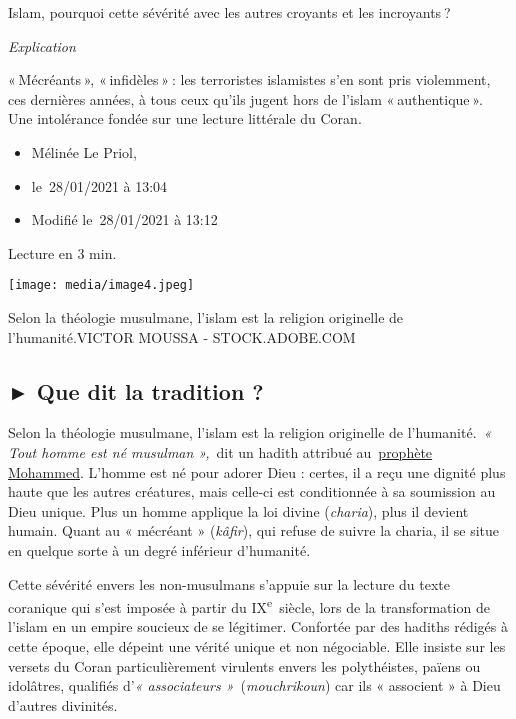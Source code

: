 Islam, pourquoi cette sévérité avec les autres croyants et les
incroyants ?

\emph{Explication~}

« Mécréants », « infidèles » : les terroristes islamistes s'en sont pris
violemment, ces dernières années, à tous ceux qu'ils jugent hors de
l'islam « authentique ». Une intolérance fondée sur une lecture
littérale du Coran. 

\begin{itemize}
\item
  Mélinée Le Priol,~
\item
  le~28/01/2021 à 13:04~
\item
  Modifié le~28/01/2021 à 13:12
\end{itemize}

Lecture en 3 min.

\texttt{[image: media/image4.jpeg]}

Selon la théologie musulmane, l'islam est la religion originelle de
l'humanité.VICTOR MOUSSA - STOCK.ADOBE.COM

\subsection{► Que dit la tradition ?}

Selon la théologie musulmane, l'islam est la religion originelle de
l'humanité.~\emph{« Tout homme est né musulman »,}~dit un hadith
attribué
au~\href{https://www.la-croix.com/sacralite-prophete-lislam-2020-11-06-1101123195}{\underline{prophète
Mohammed}}. L'homme est né pour adorer Dieu : certes, il a reçu une
dignité plus haute que les autres créatures, mais celle-ci est
conditionnée à sa soumission au Dieu unique. Plus un homme applique la
loi divine (\emph{charia}), plus il devient humain. Quant au « mécréant
» (\emph{kâfir}), qui refuse de suivre la charia, il se situe en quelque
sorte à un degré inférieur d'humanité.

Cette sévérité envers les non-musulmans s'appuie sur la lecture du texte
coranique qui s'est imposée à partir du IX\textsuperscript{e}~siècle,
lors de la transformation de l'islam en un empire soucieux de se
légitimer. Confortée par des hadiths rédigés à cette époque, elle
dépeint une vérité unique et non négociable. Elle insiste sur les
versets du Coran particulièrement virulents envers les polythéistes,
païens ou idolâtres, qualifiés d'\emph{« associateurs
»}~(\emph{mouchrikoun}) car ils « associent » à Dieu d'autres divinités.

